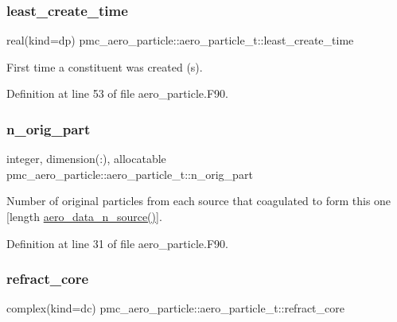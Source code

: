 \subsubsection{\texorpdfstring{least\+\_\+create\+\_\+time}{least\_create\_time}}
{\footnotesize\ttfamily real(kind=dp) pmc\+\_\+aero\+\_\+particle\+::aero\+\_\+particle\+\_\+t\+::least\+\_\+create\+\_\+time}



First time a constituent was created (s). 



Definition at line 53 of file aero\+\_\+particle.\+F90.

\mbox{\label{structpmc__aero__particle_1_1aero__particle__t_a6d32b24a475c8c29d9dd0a2bc41e5e95}} 
\subsubsection{\texorpdfstring{n\+\_\+orig\+\_\+part}{n\_orig\_part}}
{\footnotesize\ttfamily integer, dimension(\+:), allocatable pmc\+\_\+aero\+\_\+particle\+::aero\+\_\+particle\+\_\+t\+::n\+\_\+orig\+\_\+part}



Number of original particles from each source that coagulated to form this one \mbox{[}length \mbox{\hyperlink{namespacepmc__aero__data_a270b6c2baba361257005658bc293ecde}{aero\+\_\+data\+\_\+n\+\_\+source()}}\mbox{]}. 



Definition at line 31 of file aero\+\_\+particle.\+F90.

\mbox{\label{structpmc__aero__particle_1_1aero__particle__t_a726ecf75b95fd62514966c48fa8e153a}} 
\subsubsection{\texorpdfstring{refract\+\_\+core}{refract\_core}}
{\footnotesize\ttfamily complex(kind=dc) pmc\+\_\+aero\+\_\+particle\+::aero\+\_\+particle\+\_\+t\+::refract\+\_\+core}




